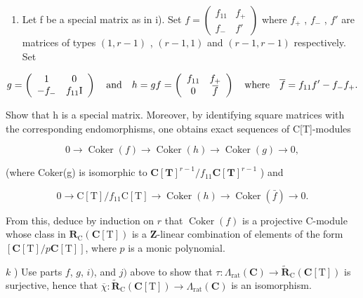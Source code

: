 \begin{enumerate}
\def\labelenumi{\alph{enumi})}
\setcounter{enumi}{9}
\tightlist
\item
  Let f be a special matrix as in i). Set \(f = \begin{pmatrix} f_{11} & f_{+} \\ f_{-} & f' \end{pmatrix}\) where \(f_{+}\) , \(f_{-}\) , \(f'\) are matrices of types \((1, r - 1)\) , \((r - 1, 1)\) and \((r - 1, r - 1)\) respectively. Set
\end{enumerate}

\[
g = \left( \begin{array}{c c} 1 & 0 \\ - f _ {-} & f _ {1 1} \mathrm{I} \end{array} \right) \quad \text {and} \quad h = g f = \left( \begin{array}{c c} f _ {1 1} & f _ {+} \\ 0 & \overline {{f}} \end{array} \right) \quad \text {where} \quad \overline {{f}} = f _ {1 1} f ^ {\prime} - f _ {-} f _ {+}.
\]

Show that h is a special matrix. Moreover, by identifying square matrices with the corresponding endomorphisms, one obtains exact sequences of C{[}T{]}-modules

\[
0 \rightarrow \operatorname{Coker} (f) \rightarrow \operatorname{Coker} (h) \rightarrow \operatorname{Coker} (g) \rightarrow 0,
\]

(where Coker(g) is isomorphic to \(\mathbf{C}[\mathbf{T}]^{r - 1} / f_{11}\mathbf{C}[\mathbf{T}]^{r - 1}\) ) and

\[
0 \rightarrow \mathrm{C} [ \mathrm{T} ] / f _ {1 1} \mathrm{C} [ \mathrm{T} ] \rightarrow \operatorname{Coker} (h) \rightarrow \operatorname{Coker} (\bar {f}) \rightarrow 0.
\]

From this, deduce by induction on \(r\) that \(\operatorname{Coker}(f)\) is a projective C-module whose class in \(\mathbf{R}_{\mathrm{C}}(\mathbf{C}[\mathrm{T}])\) is a \(\mathbf{Z}\)-linear combination of elements of the form \([\mathbf{C}[\mathrm{T}] / p\mathbf{C}[\mathrm{T}]]\), where \(p\) is a monic polynomial.

  \(k\) ) Use parts \(f\), \(g\), \(i)\), and \(j)\) above to show that \(\tau : \Lambda_{\mathrm{rat}}(\mathbf{C}) \to \tilde{\mathbf{R}}_{\mathrm{C}}(\mathbf{C}[\mathrm{T}])\) is surjective, hence that \(\overline{\chi} : \tilde{\mathbf{R}}_{\mathrm{C}}(\mathbf{C}[\mathrm{T}]) \to \Lambda_{\mathrm{rat}}(\mathbf{C})\) is an isomorphism.

